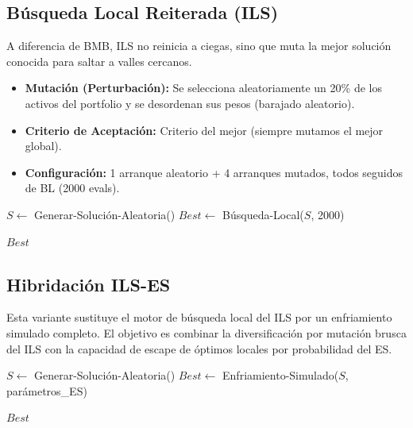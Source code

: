 \subsection{Búsqueda Local Reiterada (ILS)}

A diferencia de BMB, ILS no reinicia a ciegas, sino que muta la mejor solución 
conocida para saltar a valles cercanos.

\begin{itemize}
    \item \textbf{Mutación (Perturbación):} Se selecciona aleatoriamente un 20\% de los 
    activos del portfolio y se desordenan sus pesos (barajado aleatorio).
    \item \textbf{Criterio de Aceptación:} Criterio del mejor (siempre mutamos el mejor global).
    \item \textbf{Configuración:} 1 arranque aleatorio + 4 arranques mutados, todos 
    seguidos de BL (2000 evals).
\end{itemize}

\begin{algorithm}[H]
\SetAlgoLined
{}

$S \leftarrow$ Generar-Solución-Aleatoria()\;
$Best \leftarrow$ Búsqueda-Local($S$, 2000)\;

\Return $Best$\;
\caption{Búsqueda Local Reiterada (ILS)}
\label{alg:ils}
\end{algorithm}

\subsection{Hibridación ILS-ES}

Esta variante sustituye el motor de búsqueda local del ILS por un enfriamiento 
simulado completo. El objetivo es combinar la diversificación por mutación 
brusca del ILS con la capacidad de escape de óptimos locales por probabilidad 
del ES.

\begin{algorithm}[H]
\SetAlgoLined
{}

$S \leftarrow$ Generar-Solución-Aleatoria()\;
$Best \leftarrow$ Enfriamiento-Simulado($S$, parámetros\_ES)\;

\Return $Best$\;
\caption{Hibridación ILS-ES}
\label{alg:ils-es}
\end{algorithm}

